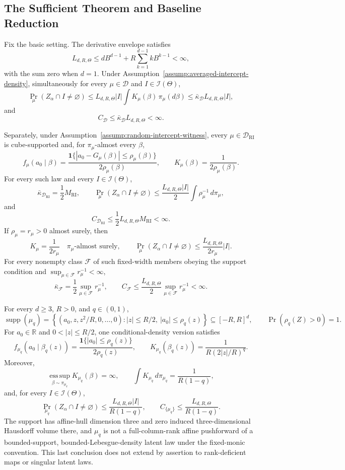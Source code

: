 \subsection{The Sufficient Theorem and Baseline Reduction}
\label{app:theorem-composition}

\begin{proposition}
\label{prop:complete-sufficient-theorem}
Fix the basic setting.  The derivative envelope satisfies
\[
L_{d,R,\Theta}
\leq dB^{d-1}+R\sum_{k=1}^{d-1}kB^{k-1}<\infty,
\]
with the sum zero when $d=1$.  Under
Assumption~\ref{assump:averaged-intercept-density}, simultaneously for
every $\mu\in\mathcal D$ and $I\in\mathscr I(\Theta)$,
\[
\Pr_\mu(Z_\alpha\cap I\neq\varnothing)
\leq L_{d,R,\Theta}|I|
      \int K_\mu(\beta)\,\pi_\mu(d\beta)
\leq\bar\kappa_{\mathcal D}L_{d,R,\Theta}|I|,
\]
and
\[
C_{\mathcal D}
\leq\bar\kappa_{\mathcal D}L_{d,R,\Theta}<\infty.
\]

Separately, under Assumption~\ref{assump:random-intercept-witness}, every
$\mu\in\mathcal D_{\mathrm{RI}}$ is cube-supported and, for
$\pi_\mu$-almost every $\beta$,
\[
f_\mu(a_0\mid\beta)
=\frac{\mathbf1\{|a_0-G_\mu(\beta)|\leq\rho_\mu(\beta)\}}
       {2\rho_\mu(\beta)},
\qquad
K_\mu(\beta)=\frac1{2\rho_\mu(\beta)}.
\]
For every such law and every $I\in\mathscr I(\Theta)$,
\[
\bar\kappa_{\mathcal D_{\mathrm{RI}}}=\frac12M_{\mathrm{RI}},
\qquad
\Pr_\mu(Z_\alpha\cap I\neq\varnothing)
\leq\frac{L_{d,R,\Theta}|I|}{2}
      \int\rho_\mu^{-1}\,d\pi_\mu,
\]
and
\[
C_{\mathcal D_{\mathrm{RI}}}
\leq\frac12L_{d,R,\Theta}M_{\mathrm{RI}}<\infty.
\]
If $\rho_\mu=r_\mu>0$ almost surely, then
\[
K_\mu=\frac1{2r_\mu}\quad\pi_\mu\text{-almost surely},
\qquad
\Pr_\mu(Z_\alpha\cap I\neq\varnothing)
\leq\frac{L_{d,R,\Theta}}{2r_\mu}|I|.
\]
For every nonempty class $\mathcal F$ of such fixed-width members obeying
the support condition and
$\sup_{\mu\in\mathcal F}r_\mu^{-1}<\infty$,
\[
\bar\kappa_{\mathcal F}
=\frac12\sup_{\mu\in\mathcal F}r_\mu^{-1},
\qquad
C_{\mathcal F}
\leq\frac{L_{d,R,\Theta}}2
      \sup_{\mu\in\mathcal F}r_\mu^{-1}<\infty.
\]

For every $d\geq3$, $R>0$, and $q\in(0,1)$,
\[
\operatorname{supp}(\mu_q)
=\left\{(a_0,z,z^2/R,0,\ldots,0):
|z|\leq R/2,\ |a_0|\leq\rho_q(z)\right\}
\subseteq[-R,R]^d,
\qquad
\Pr(\rho_q(Z)>0)=1.
\]
For $a_0\in\mathbb R$ and $0<|z|\leq R/2$, one conditional-density
version satisfies
\[
f_{\mu_q}(a_0\mid\beta_q(z))
=\frac{\mathbf1\{|a_0|\leq\rho_q(z)\}}{2\rho_q(z)},
\qquad
K_{\mu_q}(\beta_q(z))
=\frac1{R(2|z|/R)^q}.
\]
Moreover,
\[
\operatorname*{ess\,sup}_{\beta\sim\pi_{\mu_q}}
K_{\mu_q}(\beta)=\infty,
\qquad
\int K_{\mu_q}\,d\pi_{\mu_q}=\frac1{R(1-q)},
\]
and, for every $I\in\mathscr I(\Theta)$,
\[
\Pr_{\mu_q}(Z_\alpha\cap I\neq\varnothing)
\leq\frac{L_{d,R,\Theta}|I|}{R(1-q)},
\qquad
C_{\{\mu_q\}}
\leq\frac{L_{d,R,\Theta}}{R(1-q)}.
\]
The support has affine-hull dimension three and zero induced
three-dimensional Hausdorff volume there, and $\mu_q$ is not a
full-column-rank affine pushforward of a bounded-support,
bounded-Lebesgue-density latent law under the fixed-monic convention.
This last conclusion does not extend by assertion to rank-deficient maps
or singular latent laws.


\end{proposition}
